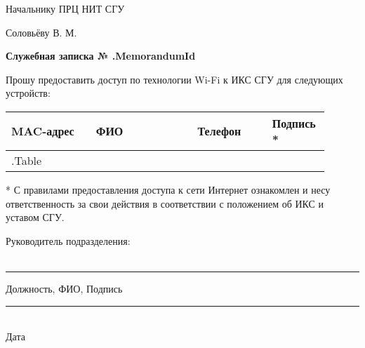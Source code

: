 \documentclass[12pt]{article}
\begin{document}
\begin{flushright}
Начальнику ПРЦ НИТ СГУ

Соловьёву В. М. \\[50pt]
\end{flushright}

\begin{center}
\large
\textbf{Служебная записка № {{.MemorandumId}} } \\[20pt]
\end{center}
\begin{flushleft}
\large
Прошу предоставить доступ по технологии Wi-Fi к ИКС СГУ для следующих устройств:
\end{flushleft}




\begin{table}[!h]
\large
\centering
\label{my-label}
\begin{tabular}{|p{0.25\linewidth}|p{0.3\linewidth}|p{0.22\linewidth}|p{0.135\linewidth}|}
\hline
MAC-адрес & ФИО & Телефон & Подпись *  \\
\hline
{{.Table}}
\end{tabular}
\end{table}


\small
* С правилами предоставления доступа к сети Интернет ознакомлен и несу ответственность за свои действия в соответствии с положением об ИКС и уставом СГУ. \\[30pt]

\normalsize
\begin{flushleft}
\large
Руководитель подразделения:\\~\\
\end{flushleft}
\centering
\noindent\rule{550pt}{0.4pt}
\large
Должность, ФИО, Подпись\\[50pt]

\begin{flushright}
\normalsize
  \noindent\rule{100pt}{0.4pt} \\
  Дата           
\end{flushright}
\end{document}
